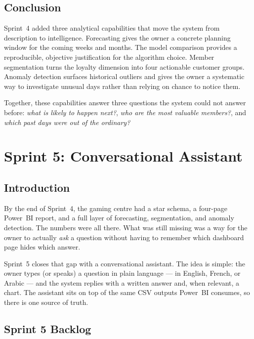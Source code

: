 \section{Conclusion}

Sprint~4 added three analytical capabilities that move the system from description to
intelligence. Forecasting gives the owner a concrete planning window for the coming
weeks and months. The model comparison provides a reproducible, objective justification
for the algorithm choice. Member segmentation turns the loyalty dimension into four
actionable customer groups. Anomaly detection surfaces historical outliers and gives
the owner a systematic way to investigate unusual days rather than relying on chance
to notice them.

Together, these capabilities answer three questions the system could not answer before:
\textit{what is likely to happen next?}, \textit{who are the most valuable members?},
and \textit{which past days were out of the ordinary?}

\chapter{Sprint 5: Conversational Assistant}

\section{Introduction}

By the end of Sprint~4, the gaming centre had a star schema, a four-page
Power~BI report, and a full layer of forecasting, segmentation, and
anomaly detection. The numbers were all there. What was still missing was
a way for the owner to actually \emph{ask} a question without having to
remember which dashboard page hides which answer.

Sprint~5 closes that gap with a conversational assistant. The idea is
simple: the owner types (or speaks) a question in plain language --- in
English, French, or Arabic --- and the system replies with a written
answer and, when relevant, a chart. The assistant sits on top of the same
CSV outputs Power~BI consumes, so there is one source of truth.

\section{Sprint 5 Backlog}

